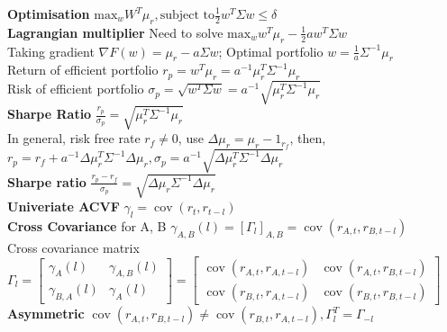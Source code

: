 \documentclass[10pt,landscape, a4paper]{article}
\theoremstyle{remark}
\newcommand{\cov}[1]{\operatorname{cov}(#1)}
\begin{document}
\begin{multicols*}{3}
\textbf{Optimisation} $\text{max}_w W^T\mu_r, \text{subject to} \frac{1}{2}w^T \Sigma w \leq \delta $\\
\textbf{Lagrangian multiplier} Need to solve $\mathrm{max}_w w^T \mu_r - \frac{1}{2} aw^T\Sigma w$\\
Taking gradient $\nabla F(w) = \mu_r - a\Sigma w$; Optimal portfolio $w = \frac{1}{a} \Sigma^{-1} \mu_r$\\
Return of efficient portfolio $r_p = w^T \mu_r = a^{-1} \mu_r^T \Sigma^{-1} \mu_r $\\
Risk of efficient portfolio $\sigma_p = \sqrt{w^T \Sigma w} = a^{-1} \sqrt{\mu^T_r \Sigma^{-1} \mu_r }$\\
\textbf{Sharpe Ratio} $\frac{r_p}{\sigma_p} = \sqrt{\mu^T_r \Sigma^{-1} \mu_r}$\\
In general, risk free rate $r_f \neq 0$, use $\Delta \mu_r = \mu_r - 1_{r_f}$, then,
$r_p = r_f + a^{-1} \Delta \mu^T_r \Sigma^{-1} \Delta \mu_r, \sigma_p = a^{-1} \sqrt{\Delta\mu^T_r \Sigma^{-1} \Delta\mu_r}$\\
\textbf{Sharpe ratio} $\frac{r_p - r_f}{\sigma_p} = \sqrt{\Delta\mu_r \Sigma^{-1} \Delta \mu_r}$\\
\textbf{Univeriate ACVF} $\gamma_l = \cov{r_t, r_{t-l}}$\\
\textbf{Cross Covariance} for A, B $\gamma_{A, B} (l) = [\Gamma_l]_{A, B} = \cov{r_{A, t}, r_{B, t-l}}$\\
Cross covariance matrix $\Gamma_l = \begin{bmatrix}
    \gamma_A (l) &\gamma_{A, B} (l)\\
    \gamma_{B, A} (l) &\gamma_A (l)
\end{bmatrix} = \begin{bmatrix}
    \cov{r_{A, t}, r_{A, t-l}} &\cov{r_{A, t}, r_{B, t-l}}\\
    \cov{r_{B, t}, r_{A, t-l}} &\cov{r_{B, t}, r_{B, t-l}}
\end{bmatrix}$\\
\textbf{Asymmetric} $\cov{r_{A, t}, r_{B, t-l}}\neq \cov{r_{B, t}, r_{A, t-l}}, \Gamma^T_l = \Gamma_{-l}$\\


\end{multicols*}
\end{document}
